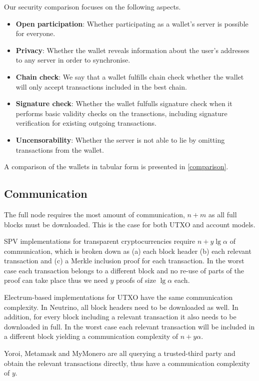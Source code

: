 Our security comparison focuses on the following aspects.
\begin{itemize}
    \item \textbf{Open participation}: Whether participating as a wallet's server is possible for everyone.
    \item \textbf{Privacy}: Whether the wallet reveals information about the user's addresses to any server in order to synchronise.
    \item \textbf{Chain check}: We say that a wallet fulfills chain check whether the wallet will only accept transactions included in the best chain.
    \item \textbf{Signature check}: Whether the wallet fulfulls signature check when it performs basic validity checks on the transctions, including signature verification for existing outgoing transactions.
    \item \textbf{Uncensorability}: Whether the server is not able to lie by omitting transactions from the wallet.
\end{itemize}

A comparison of the wallets in tabular form is presented in \cref{comparison}.

\subsection{Communication}
The full node requires the most amount of communication, $n+m$ as all full blocks must be downloaded. This is the case for both UTXO and account models.

SPV implementations for transparent cryptocurrencies require $n+y\lg{\alpha}$ of communication, which is broken down as (a) each block header (b) each relevant transaction and (c) a Merkle inclusion proof for each transaction. In the worst case each transaction belongs to a different block and no re-use of parts of the proof can take place thus we need $y$ proofs of size $\lg{\alpha}$ each.

Electrum-based implementations for UTXO have the same communication complexity. In Neutrino, all block headers need to be downloaded as well. In addition, for every block including a relevant transaction it also needs to be downloaded in full. In the worst case each relevant transaction will be included in a different block yielding a communication complexity of $n+y\alpha$.

Yoroi, Metamask and MyMonero are all querying a trusted-third party and obtain the relevant transactions directly, thus have a communication complexity of $y$.

